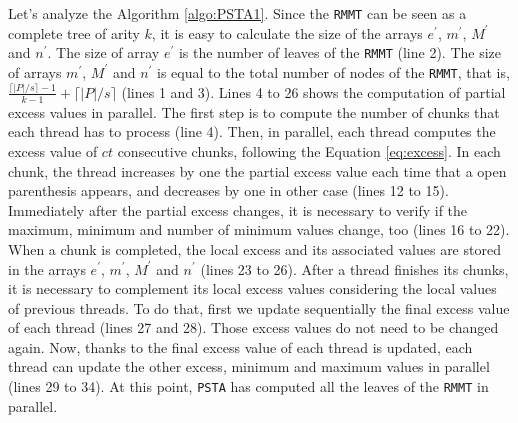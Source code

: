 	Let's analyze the Algorithm \ref{algo:PSTA1}. Since the {\tt RMMT} can be seen as a complete tree of arity $k$, it is easy to calculate the size of the arrays $e^{\prime}$, $m^{\prime}$, $M^{\prime}$ and $n^{\prime}$. The size of array $e^{\prime}$ is the number of leaves of the {\tt RMMT} (line 2). The size of arrays $m^{\prime}$, $M^{\prime}$ and $n^{\prime}$ is equal to the total number of nodes of the {\tt RMMT}, that is, $\frac{\lceil |P|/s \rceil-1}{k-1} + \lceil |P|/s \rceil$ (lines 1 and 3). Lines 4 to 26 shows the computation of partial excess values in parallel. The first step is to compute the number of chunks that each thread has to process (line 4). Then, in parallel, each thread computes the excess value of $ct$ consecutive chunks, following the Equation \ref{eq:excess}. In each chunk, the thread increases by one the partial excess value each time that a open parenthesis appears, and decreases by one in other case (lines 12 to 15). Immediately after the partial excess changes, it is necessary to verify if the maximum, minimum and number of minimum values change, too (lines 16 to 22). When a chunk is completed, the local excess and its associated values are stored in the arrays $e^{\prime}$, $m^{\prime}$, $M^{\prime}$ and $n^{\prime}$ (lines 23 to 26). After a thread finishes its chunks, it is necessary to complement its local excess values considering the local values of previous threads. To do that, first we update sequentially the final excess value of each thread (lines 27 and 28). Those excess values do not need to be changed again. Now, thanks to the final excess value of each thread is updated, each thread can update the other excess, minimum and maximum values in parallel (lines 29 to 34). At this point, {\tt PSTA} has computed all the leaves of the {\tt RMMT} in parallel.

